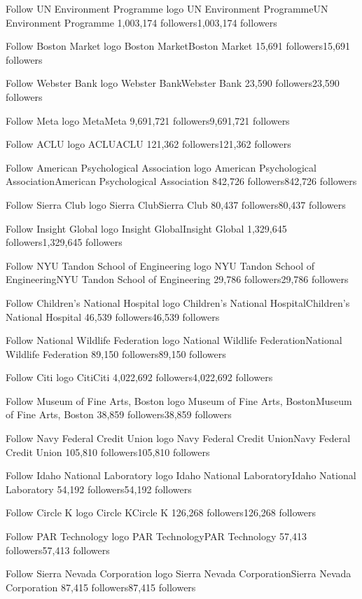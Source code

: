 Follow
UN Environment Programme logo
UN Environment ProgrammeUN Environment Programme
1,003,174 followers1,003,174 followers

Follow
Boston Market logo
Boston MarketBoston Market
15,691 followers15,691 followers

Follow
Webster Bank logo
Webster BankWebster Bank
23,590 followers23,590 followers

Follow
Meta logo
MetaMeta
9,691,721 followers9,691,721 followers

Follow
ACLU logo
ACLUACLU
121,362 followers121,362 followers

Follow
American Psychological Association logo
American Psychological AssociationAmerican Psychological Association
842,726 followers842,726 followers

Follow
Sierra Club logo
Sierra ClubSierra Club
80,437 followers80,437 followers

Follow
Insight Global logo
Insight GlobalInsight Global
1,329,645 followers1,329,645 followers

Follow
NYU Tandon School of Engineering logo
NYU Tandon School of EngineeringNYU Tandon School of Engineering
29,786 followers29,786 followers

Follow
Children's National Hospital logo
Children's National HospitalChildren's National Hospital
46,539 followers46,539 followers

Follow
National Wildlife Federation logo
National Wildlife FederationNational Wildlife Federation
89,150 followers89,150 followers

Follow
Citi logo
CitiCiti
4,022,692 followers4,022,692 followers

Follow
Museum of Fine Arts, Boston logo
Museum of Fine Arts, BostonMuseum of Fine Arts, Boston
38,859 followers38,859 followers

Follow
Navy Federal Credit Union logo
Navy Federal Credit UnionNavy Federal Credit Union
105,810 followers105,810 followers

Follow
Idaho National Laboratory logo
Idaho National LaboratoryIdaho National Laboratory
54,192 followers54,192 followers

Follow
Circle K logo
Circle KCircle K
126,268 followers126,268 followers

Follow
PAR Technology logo
PAR TechnologyPAR Technology
57,413 followers57,413 followers

Follow
Sierra Nevada Corporation logo
Sierra Nevada CorporationSierra Nevada Corporation
87,415 followers87,415 followers

